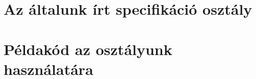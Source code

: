\clearpage
\appendix
\section{Az általunk írt specifikáció osztály}
	
\section{Példakód az osztályunk használatára}
	

